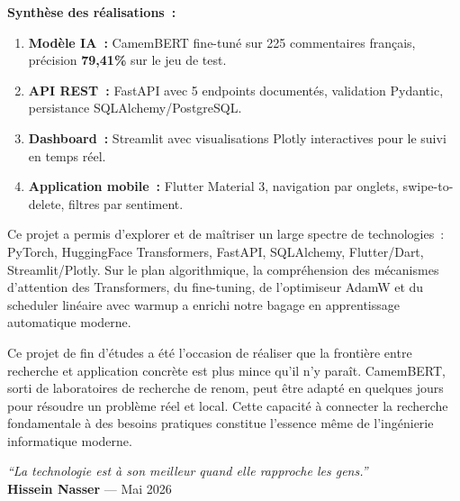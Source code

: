 \documentclass[12pt,a4paper,oneside]{report}
\begin{document}
\vspace{0.4cm}
\begin{tcolorbox}[enhanced,colback=bleuprincipal!5!white,colframe=bleuprincipal,
  boxrule=1.5pt,arc=6pt,left=10pt,right=10pt,top=8pt,bottom=8pt]
\textbf{Synthèse des réalisations~:}
\begin{enumerate}
  \item \textbf{Modèle IA~:} CamemBERT fine-tuné sur 225 commentaires
        français, précision \textbf{79,41\%} sur le jeu de test.
  \item \textbf{API REST~:} FastAPI avec 5 endpoints documentés,
        validation Pydantic, persistance SQLAlchemy/PostgreSQL.
  \item \textbf{Dashboard~:} Streamlit avec visualisations Plotly
        interactives pour le suivi en temps réel.
  \item \textbf{Application mobile~:} Flutter Material 3, navigation
        par onglets, swipe-to-delete, filtres par sentiment.
\end{enumerate}
\end{tcolorbox}

\vspace{0.4cm}

Ce projet a permis d'explorer et de maîtriser un large spectre de
technologies~: PyTorch, HuggingFace Transformers, FastAPI, SQLAlchemy,
Flutter/Dart, Streamlit/Plotly. Sur le plan algorithmique, la compréhension
des mécanismes d'attention des Transformers, du fine-tuning, de l'optimiseur
AdamW et du scheduler linéaire avec warmup a enrichi notre bagage en
apprentissage automatique moderne.

\vspace{0.4cm}

Ce projet de fin d'études a été l'occasion de réaliser que la frontière
entre recherche et application concrète est plus mince qu'il n'y paraît.
CamemBERT, sorti de laboratoires de recherche de renom, peut être adapté
en quelques jours pour résoudre un problème réel et local. Cette capacité
à connecter la recherche fondamentale à des besoins pratiques constitue
l'essence même de l'ingénierie informatique moderne.

\vspace{0.5cm}
\begin{flushright}
\textit{``La technologie est à son meilleur quand elle rapproche les gens.''}\\[0.3cm]
\textbf{Hissein Nasser} --- Mai 2026
\end{flushright}
\cleardoublepage

\printbibliography[heading=bibintoc,title={Références Bibliographiques}]
\end{document}

